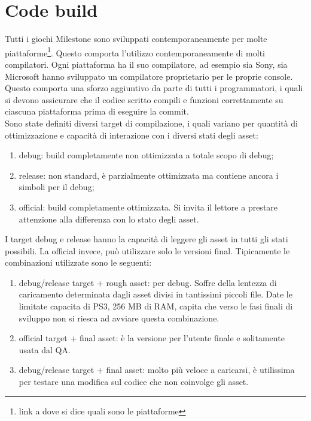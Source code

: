 \section{Code build}

Tutti i giochi Milestone sono sviluppati contemporaneamente per molte piattaforme\footnote{link a dove si dice quali sono le piattaforme}. Questo comporta l'utilizzo contemporaneamente di molti compilatori. Ogni piattaforma ha il suo compilatore, ad esempio sia Sony, sia Microsoft hanno sviluppato un compilatore proprietario per le proprie console. Questo comporta una sforzo aggiuntivo da parte di tutti i programmatori, i quali si devono assicurare che il codice scritto compili e funzioni correttamente su ciascuna piattaforma prima di eseguire la commit.\\

Sono state definiti diversi target di compilazione, i quali variano per quantità di ottimizzazione e capacità di interazione con i diversi stati degli asset:
\begin{enumerate}
	\item debug: build completamente non ottimizzata a totale scopo di debug;
	\item release: non standard, è parzialmente ottimizzata ma contiene ancora i simboli per il debug;
	\item official: build completamente ottimizzata. Si invita il lettore a prestare attenzione alla differenza con lo stato  degli asset.
\end{enumerate}

I target debug e release hanno la capacità di leggere gli asset in tutti gli stati possibili. La official invece, può utilizzare solo le versioni final. Tipicamente le combinazioni utilizzate sono le seguenti:
\begin{enumerate}
	\item debug/release target + rough asset: per debug. Soffre della lentezza di caricamento determinata dagli asset divisi in tantissimi piccoli file. Date le limitate capacita di PS3\textsuperscript{\textregistered}, 256 MB di RAM, capita che verso le fasi finali di sviluppo non si riesca ad avviare questa combinazione.
	\item official target + final asset: è la versione per l'utente finale e solitamente usata dal QA.
	\item debug/release target + final asset: molto più veloce a caricarsi, è utilissima per testare una modifica sul codice che non coinvolge gli asset.
\end{enumerate}

